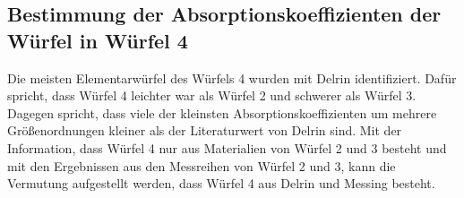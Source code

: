 \subsection{Bestimmung der Absorptionskoeffizienten der Würfel in Würfel 4}

Die meisten Elementarwürfel des Würfels 4 wurden mit Delrin identifiziert. Dafür spricht, dass Würfel 4 leichter war 
als Würfel 2 und schwerer als Würfel 3. Dagegen spricht, dass viele der kleinsten Absorptionskoeffizienten 
um mehrere Größenordnungen kleiner als der Literaturwert von 
Delrin sind.
Mit der Information, dass Würfel 4 nur aus Materialien von Würfel 2 und 3 besteht und mit den Ergebnissen aus den Messreihen
von Würfel 2 und 3, kann die Vermutung aufgestellt werden, dass Würfel 4 aus Delrin und Messing besteht. 
\newpage